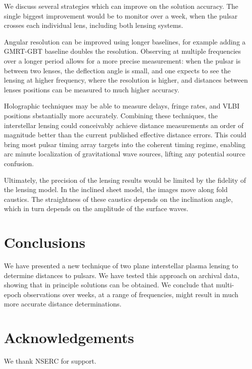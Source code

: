 \documentclass[useAMS,usenatbib]{mn2e}
\begin{document}
We discuss several strategies which can improve on the solution
accuracy.  The single biggest improvement would be to monitor over a
week, when the pulsar crosses each individual lens, including both
lensing systems.

Angular resolution can be improved using longer baselines, for example
adding a GMRT-GBT baseline doubles the resolution.  Observing at
multiple frequencies over a longer period allows for a more precise
measurement: when the pulsar is between two lenses, the deflection
angle is small, and one expects to see the lensing at higher
frequency, where the resolution is higher, and distances between
lenses positions can be measured to much higher accuracy.

Holographic techniques\citep{2008MNRAS.388.1214W,2014MNRAS.440L..36P}
may be able to measure delays, fringe rates, and VLBI positions
sbstantially more accurately.  Combining these techniques, the
interstellar lensing could conceivably achieve distance measurements
an order of magnitude better than the current published effective
distance errors.  This could bring most pulsar timing array targets
into the coherent timing regime, enabling arc minute localization of
gravitational wave sources, lifting any potential source confusion.

Ultimately, the precision of the lensing results would be limited by
the fidelity of the lensing model.  In the inclined sheet model, the
images move along fold caustics.  The straightness of these caustics
depends on the inclination angle, which in turn depends on the
amplitude of the surface waves.

\section{Conclusions}

We have presented a new technique of two plane interstellar plasma
lensing to determine distances to pulsars.  We have tested this
approach on archival data, showing that in principle solutions can be
obtained.  We conclude that multi-epoch observations over weeks, at a
range of frequencies, might result in much more accurate distance
determinations.


\section{Acknowledgements}

We thank NSERC for support.
\end{document}

